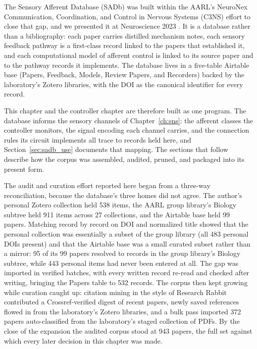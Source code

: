 The Sensory Afferent Database (SADb) was built within the AARL's NeuroNex Communication, Coordination, and Control in Nervous Systems (C3NS) effort to close that gap, and we presented it at Neuroscience 2023 \citep{bolen_sensory_2023}. It is a database rather than a bibliography: each paper carries distilled mechanism notes, each sensory feedback pathway is a first-class record linked to the papers that established it, and each computational model of afferent control is linked to its source paper and to the pathway records it implements. The database lives in a five-table Airtable base (Papers, Feedback, Models, Review Papers, and Recorders) backed by the laboratory's Zotero libraries, with the DOI as the canonical identifier for every record.

This chapter and the controller chapter are therefore built as one program. The database informs the sensory channels of Chapter~\ref{ch:sns}: the afferent classes the controller monitors, the signal encoding each channel carries, and the connection rules its circuit implements all trace to records held here, and Section~\ref{sec:sadb_use} documents that mapping. The sections that follow describe how the corpus was assembled, audited, pruned, and packaged into its present form.

The audit and curation effort reported here began from a three-way reconciliation, because the database's three homes did not agree. The author's personal Zotero collection held 538 items, the AARL group library's Biology subtree held 911 items across 27 collections, and the Airtable base held 99 papers. Matching record by record on DOI and normalized title showed that the personal collection was essentially a subset of the group library (all 483 personal DOIs present) and that the Airtable base was a small curated subset rather than a mirror: 95 of its 99 papers resolved to records in the group library's Biology subtree, while 443 personal items had never been entered at all. The gap was imported in verified batches, with every written record re-read and checked after writing, bringing the Papers table to 532 records. The corpus then kept growing while curation caught up: citation mining in the style of Research Rabbit contributed a Crossref-verified digest of recent papers, newly saved references flowed in from the laboratory's Zotero libraries, and a bulk pass imported 372 papers auto-classified from the laboratory's staged collection of PDFs. By the close of the expansion the audited corpus stood at 943 papers, the full set against which every later decision in this chapter was made.

